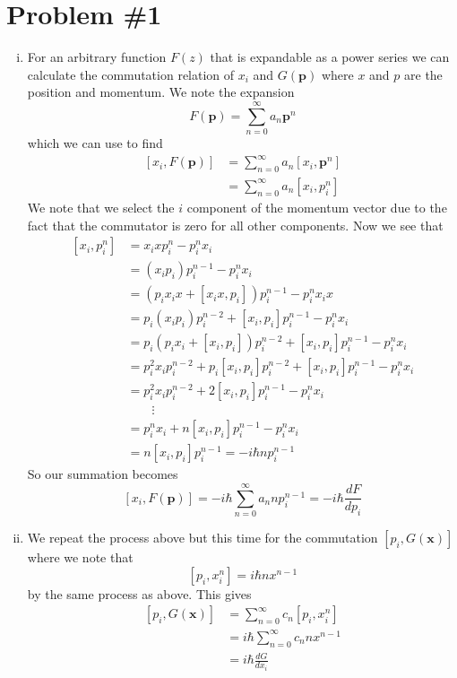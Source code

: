\documentclass[11pt]{article}
\numberwithin{equation}{section}
\begin{document}


\section{Problem \#1}
\begin{enumerate}[(i)]
\item For an arbitrary function $F(z)$ that is expandable as a power series we can calculate
the commutation relation of $x_i$ and $G(\mathbf{p})$ where $x$ and $p$ are the position and
momentum. We note the expansion
$$F(\mathbf{p}) = \sum_{n=0}^{\infty}a_n\mathbf{p}^n$$
which we can use to find
\begin{align*}
\left[x_i,F(\mathbf{p})\right] &= \sum_{n=0}^{\infty}a_n\left[x_i,\mathbf{p}^n\right]\\
&= \sum_{n=0}^{\infty}a_n\left[x_i,p_i^n\right]
\end{align*}
We note that we select the $i$ component of the momentum vector due to the fact that the 
commutator is zero for all other components. Now we see that
\begin{align*}
\left[x_i,p_i^n\right] &= x_ixp_i^n - p_i^nx_i\\
&= (x_ip_i)p_i^{n-1} - p_i^nx_i\\
&= \left(p_ix_ix+[x_ix,p_i]^{}\right)p_i^{n-1} - p_i^nx_ix\\
&= p_i(x_ip_i)p_i^{n-2}+[x_i,p_i]p_i^{n-1} - p_i^nx_i\\
&= p_i(p_ix_i+[x_i,p_i])p_i^{n-2}+[x_i,p_i]p_i^{n-1} - p_i^nx_i\\
&= p_i^2x_ip_i^{n-2} + p_i[x_i,p_i]p_i^{n-2}+[x_i,p_i]p_i^{n-1} - p_i^nx_i\\
&= p_i^2x_ip_i^{n-2} + 2[x_i,p_i]p_i^{n-1} - p_i^nx_i\\
&\qquad\vdots\\
&= p_i^nx_i + n[x_i,p_i]p_i^{n-1} - p_i^nx_i\\
&= n[x_i,p_i]p_i^{n-1} = -i\hbar np_i^{n-1}
\end{align*}
So our summation becomes
$$\left[x_i,F(\mathbf{p})\right] = -i\hbar\sum_{n=0}^{\infty}a_n np_i^{n-1} = -i\hbar\frac{dF}{dp_i}$$

\item We repeat the process above but this time for the commutation $[p_i,G(\mathbf{x})]$ 
where we note that 
$$[p_i,x_i^n] = i\hbar nx^{n-1}$$
by the same process as above. This gives
\begin{align*}
\left[p_i,G(\mathbf{x})\right] &= \sum_{n=0}^{\infty}c_n[p_i,x_i^n]\\
&= i\hbar\sum_{n=0}^{\infty}c_nnx^{n-1}\\
&= i\hbar\frac{dG}{dx_i}
\end{align*}
\end{enumerate}
\end{document}
